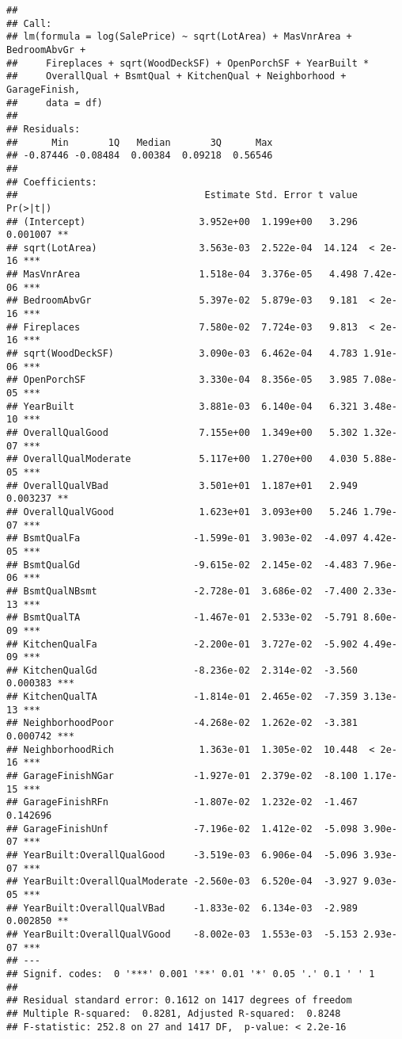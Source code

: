 \documentclass[
]{article}
\begin{document}
\begin{verbatim}
## 
## Call:
## lm(formula = log(SalePrice) ~ sqrt(LotArea) + MasVnrArea + BedroomAbvGr + 
##     Fireplaces + sqrt(WoodDeckSF) + OpenPorchSF + YearBuilt * 
##     OverallQual + BsmtQual + KitchenQual + Neighborhood + GarageFinish, 
##     data = df)
## 
## Residuals:
##      Min       1Q   Median       3Q      Max 
## -0.87446 -0.08484  0.00384  0.09218  0.56546 
## 
## Coefficients:
##                                 Estimate Std. Error t value Pr(>|t|)    
## (Intercept)                    3.952e+00  1.199e+00   3.296 0.001007 ** 
## sqrt(LotArea)                  3.563e-03  2.522e-04  14.124  < 2e-16 ***
## MasVnrArea                     1.518e-04  3.376e-05   4.498 7.42e-06 ***
## BedroomAbvGr                   5.397e-02  5.879e-03   9.181  < 2e-16 ***
## Fireplaces                     7.580e-02  7.724e-03   9.813  < 2e-16 ***
## sqrt(WoodDeckSF)               3.090e-03  6.462e-04   4.783 1.91e-06 ***
## OpenPorchSF                    3.330e-04  8.356e-05   3.985 7.08e-05 ***
## YearBuilt                      3.881e-03  6.140e-04   6.321 3.48e-10 ***
## OverallQualGood                7.155e+00  1.349e+00   5.302 1.32e-07 ***
## OverallQualModerate            5.117e+00  1.270e+00   4.030 5.88e-05 ***
## OverallQualVBad                3.501e+01  1.187e+01   2.949 0.003237 ** 
## OverallQualVGood               1.623e+01  3.093e+00   5.246 1.79e-07 ***
## BsmtQualFa                    -1.599e-01  3.903e-02  -4.097 4.42e-05 ***
## BsmtQualGd                    -9.615e-02  2.145e-02  -4.483 7.96e-06 ***
## BsmtQualNBsmt                 -2.728e-01  3.686e-02  -7.400 2.33e-13 ***
## BsmtQualTA                    -1.467e-01  2.533e-02  -5.791 8.60e-09 ***
## KitchenQualFa                 -2.200e-01  3.727e-02  -5.902 4.49e-09 ***
## KitchenQualGd                 -8.236e-02  2.314e-02  -3.560 0.000383 ***
## KitchenQualTA                 -1.814e-01  2.465e-02  -7.359 3.13e-13 ***
## NeighborhoodPoor              -4.268e-02  1.262e-02  -3.381 0.000742 ***
## NeighborhoodRich               1.363e-01  1.305e-02  10.448  < 2e-16 ***
## GarageFinishNGar              -1.927e-01  2.379e-02  -8.100 1.17e-15 ***
## GarageFinishRFn               -1.807e-02  1.232e-02  -1.467 0.142696    
## GarageFinishUnf               -7.196e-02  1.412e-02  -5.098 3.90e-07 ***
## YearBuilt:OverallQualGood     -3.519e-03  6.906e-04  -5.096 3.93e-07 ***
## YearBuilt:OverallQualModerate -2.560e-03  6.520e-04  -3.927 9.03e-05 ***
## YearBuilt:OverallQualVBad     -1.833e-02  6.134e-03  -2.989 0.002850 ** 
## YearBuilt:OverallQualVGood    -8.002e-03  1.553e-03  -5.153 2.93e-07 ***
## ---
## Signif. codes:  0 '***' 0.001 '**' 0.01 '*' 0.05 '.' 0.1 ' ' 1
## 
## Residual standard error: 0.1612 on 1417 degrees of freedom
## Multiple R-squared:  0.8281, Adjusted R-squared:  0.8248 
## F-statistic: 252.8 on 27 and 1417 DF,  p-value: < 2.2e-16
\end{verbatim}
\end{document}
